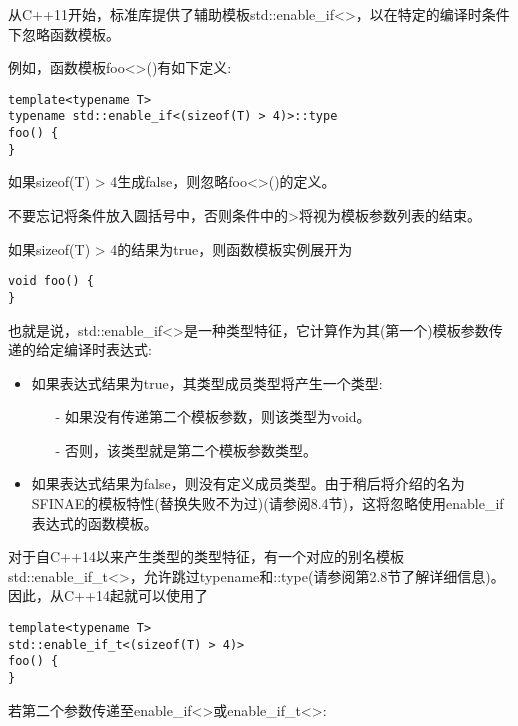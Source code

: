 从C++11开始，标准库提供了辅助模板std::enable\_if<>，以在特定的编译时条件下忽略函数模板。

例如，函数模板foo<>()有如下定义:

\begin{lstlisting}[style=styleCXX]
template<typename T>
typename std::enable_if<(sizeof(T) > 4)>::type
foo() {
}
\end{lstlisting}

如果sizeof(T) > 4生成false，则忽略foo<>()的定义。

\begin{tcolorbox}[colback=webgreen!5!white,colframe=webgreen!75!black]
\hspace*{0.75cm}不要忘记将条件放入圆括号中，否则条件中的>将视为模板参数列表的结束。
\end{tcolorbox}

如果sizeof(T) > 4的结果为true，则函数模板实例展开为

\begin{lstlisting}[style=styleCXX]
void foo() {
}
\end{lstlisting}

也就是说，std::enable\_if<>是一种类型特征，它计算作为其(第一个)模板参数传递的给定编译时表达式:

\begin{itemize}
\item 
如果表达式结果为true，其类型成员类型将产生一个类型:

\begin{itemize}
\item[-]
如果没有传递第二个模板参数，则该类型为void。
	
\item[-]
否则，该类型就是第二个模板参数类型。
\end{itemize}

\item 
如果表达式结果为false，则没有定义成员类型。由于稍后将介绍的名为SFINAE的模板特性(替换失败不为过)(请参阅8.4节)，这将忽略使用enable\_if表达式的函数模板。
\end{itemize}

对于自C++14以来产生类型的类型特征，有一个对应的别名模板std::enable\_if\_t<>，允许跳过typename和::type(请参阅第2.8节了解详细信息)。因此，从C++14起就可以使用了

\begin{lstlisting}[style=styleCXX]
template<typename T>
std::enable_if_t<(sizeof(T) > 4)>
foo() {
}
\end{lstlisting}

若第二个参数传递至enable\_if<>或enable\_if\_t<>:

